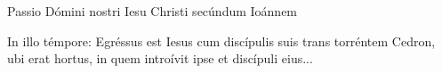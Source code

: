 
Passio Dómini nostri Iesu Christi secúndum Ioánnem

In illo témpore: Egréssus est Iesus cum discípulis suis trans torréntem Cedron, ubi erat hortus, in quem introívit ipse et discípuli eius...
\par